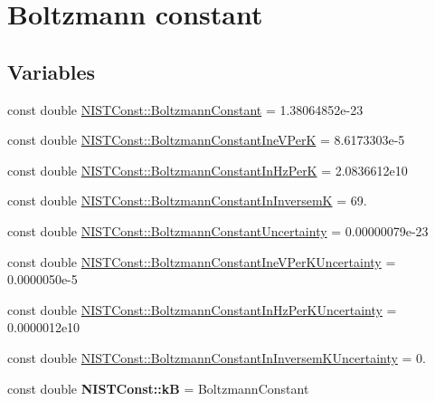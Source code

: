 \hypertarget{group___boltzmann_constant}{}\section{Boltzmann constant}
\label{group___boltzmann_constant}
\subsection*{Variables}
\begin{DoxyCompactItemize}
\item 
const double \hyperlink{group___boltzmann_constant_ga505057a2eb7e925fde668cc1025331df}{N\+I\+S\+T\+Const\+::\+Boltzmann\+Constant} = 1.\+38064852e-\/23
\item 
const double \hyperlink{group___boltzmann_constant_gad31ba56bbe6d4a0f40252ef7b48b52a3}{N\+I\+S\+T\+Const\+::\+Boltzmann\+Constant\+Ine\+V\+PerK} = 8.\+6173303e-\/5
\item 
const double \hyperlink{group___boltzmann_constant_ga5c59003e6fbd70482ee1bdaf7ea35b7a}{N\+I\+S\+T\+Const\+::\+Boltzmann\+Constant\+In\+Hz\+PerK} = 2.\+0836612e10
\item 
const double \hyperlink{group___boltzmann_constant_ga4f4d8adf824657420f54680daa6340d5}{N\+I\+S\+T\+Const\+::\+Boltzmann\+Constant\+In\+InversemK} = 69.
\item 
const double \hyperlink{group___boltzmann_constant_gaa32ac947c545e70076f0e08aceb3ce16}{N\+I\+S\+T\+Const\+::\+Boltzmann\+Constant\+Uncertainty} = 0.\+00000079e-\/23
\item 
const double \hyperlink{group___boltzmann_constant_ga6a1c42c4e69994962116d279d6f49203}{N\+I\+S\+T\+Const\+::\+Boltzmann\+Constant\+Ine\+V\+Per\+K\+Uncertainty} = 0.\+0000050e-\/5
\item 
const double \hyperlink{group___boltzmann_constant_gaa87e06f419f94e4ea1ac8dcd769537ee}{N\+I\+S\+T\+Const\+::\+Boltzmann\+Constant\+In\+Hz\+Per\+K\+Uncertainty} = 0.\+0000012e10
\item 
const double \hyperlink{group___boltzmann_constant_gadb520d4ce5d980c8ba24d9499f500873}{N\+I\+S\+T\+Const\+::\+Boltzmann\+Constant\+In\+Inversem\+K\+Uncertainty} = 0.
\item 
\mbox{\label{group___boltzmann_constant_ga6c7ead5913113ec6e980e80f21d27fd0}} 
const double {\bfseries N\+I\+S\+T\+Const\+::kB} = Boltzmann\+Constant
\item 
\mbox{\label{group___boltzmann_constant_gae6941828181b77b14f5f24a8b713570f}} 

\end{DoxyCompactItemize}
